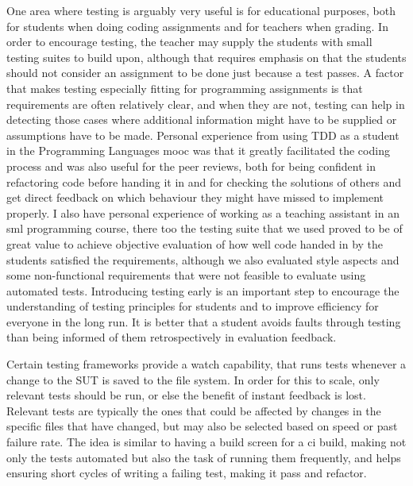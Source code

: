 \documentclass[11pt]{article}
\begin{document}
One area where testing is arguably very useful is for educational purposes, both for students when doing coding assignments and for teachers when grading. In order to encourage testing, the teacher may supply the students with small testing suites to build upon, although that requires emphasis on that the students should not consider an assignment to be done just because a test passes. A factor that makes testing especially fitting for programming assignments is that requirements are often relatively clear, and when they are not, testing can help in detecting those cases where additional information might have to be supplied or assumptions have to be made. Personal experience from using TDD as a student in the Programming Languages \gls{mooc} was that it greatly facilitated the coding process and was also useful for the peer reviews, both for being confident in refactoring code before handing it in and for checking the solutions of others and get direct feedback on which behaviour they might have missed to implement properly. I also have personal experience of working as a teaching assistant in an \gls{sml} programming course, there too the testing suite that we used proved to be of great value to achieve objective evaluation of how well code handed in by the students satisfied the requirements, although we also evaluated style aspects and some non-functional requirements that were not feasible to evaluate using automated tests. Introducing testing early is an important step to encourage the understanding of testing principles for students and to improve efficiency for everyone in the long run. It is better that a student avoids faults through testing than being informed of them retrospectively in evaluation feedback.

Certain testing frameworks provide a watch capability, that runs tests whenever a change to the SUT is saved to the file system. In order for this to scale, only relevant tests should be run, or else the benefit of instant feedback is lost. Relevant tests are typically the ones that could be affected by changes in the specific files that have changed, but may also be selected based on speed or past failure rate. The idea is similar to having a build screen for a \gls{ci} build, making not only the tests automated but also the task of running them frequently, and helps ensuring short cycles of writing a failing test, making it pass and refactor.
\end{document}
